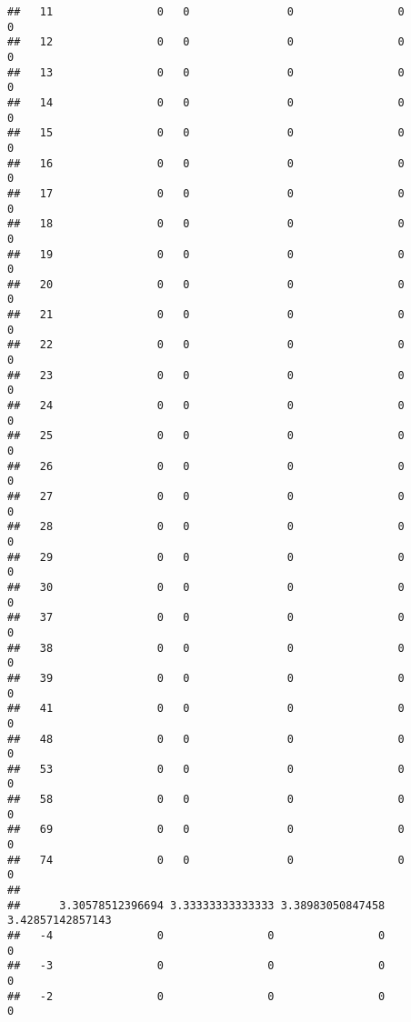 \documentclass[]{article}
\begin{document}
\begin{verbatim}
##   11                0   0               0                0                0
##   12                0   0               0                0                0
##   13                0   0               0                0                0
##   14                0   0               0                0                0
##   15                0   0               0                0                0
##   16                0   0               0                0                0
##   17                0   0               0                0                0
##   18                0   0               0                0                0
##   19                0   0               0                0                0
##   20                0   0               0                0                0
##   21                0   0               0                0                0
##   22                0   0               0                0                0
##   23                0   0               0                0                0
##   24                0   0               0                0                0
##   25                0   0               0                0                0
##   26                0   0               0                0                0
##   27                0   0               0                0                0
##   28                0   0               0                0                0
##   29                0   0               0                0                0
##   30                0   0               0                0                0
##   37                0   0               0                0                0
##   38                0   0               0                0                0
##   39                0   0               0                0                0
##   41                0   0               0                0                0
##   48                0   0               0                0                0
##   53                0   0               0                0                0
##   58                0   0               0                0                0
##   69                0   0               0                0                0
##   74                0   0               0                0                0
##     
##      3.30578512396694 3.33333333333333 3.38983050847458 3.42857142857143
##   -4                0                0                0                0
##   -3                0                0                0                0
##   -2                0                0                0                0

\end{verbatim}
\end{document}
